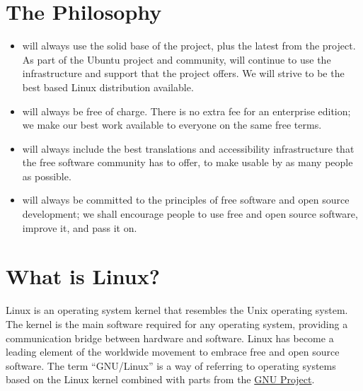 \documentclass[letterpaper,10pt,english]{sphinxmanual}
\begin{document}
\section{The  Philosophy}
\label{\detokenize{welcome:the-kubuntu-philosophy}}\begin{itemize}
\item {} 
 will always use the solid base of the  project, plus the latest from the  project. As part of the Ubuntu project and community,  will continue to use the infrastructure and support that the  project offers. We will strive to be the best  based Linux distribution available.

\item {} 
 will always be free of charge. There is no extra fee for an enterprise edition; we make our best work available to everyone on the same free terms.

\item {} 
 will always include the best translations and accessibility infrastructure that the free software community has to offer, to make  usable by as many people as possible.

\item {} 
 will always be committed to the principles of free software and open source development; we shall encourage people to use free and open source software, improve it, and pass it on.

\end{itemize}


\section{What is Linux?}
\label{\detokenize{welcome:what-is-linux}}
Linux is an operating system kernel that resembles the Unix operating system. The kernel is the main software required for any operating system, providing a communication bridge between hardware and software. Linux has become a leading element of the worldwide movement to embrace free and open source software. The term ``GNU/Linux'' is a way of referring to operating systems based on the Linux kernel combined with parts from the \href{http://www.gnu.org}{GNU Project}.
\end{document}
